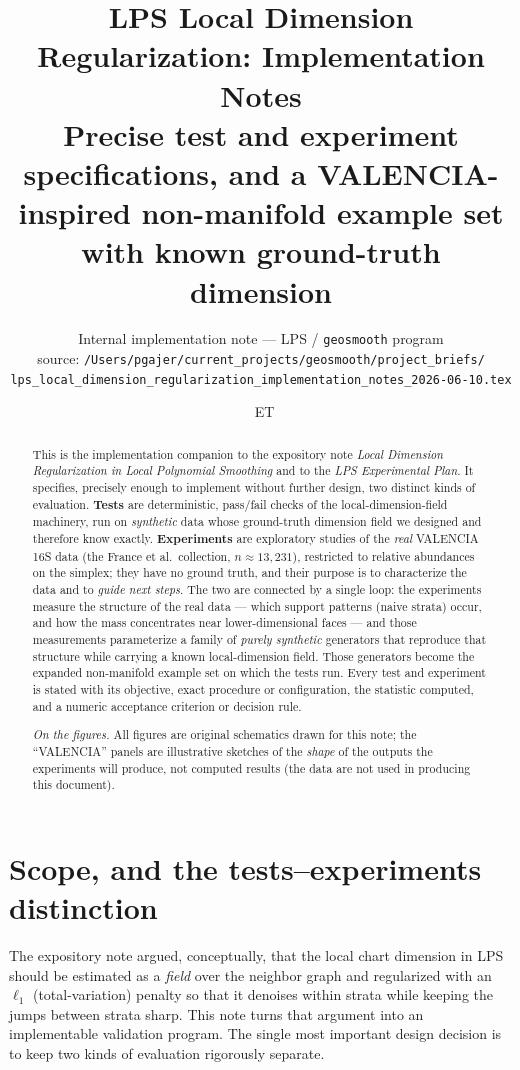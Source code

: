 \documentclass[11pt]{article}
\title{\textbf{LPS Local Dimension Regularization: Implementation Notes}\\[4pt]
\large Precise test and experiment specifications, and a VALENCIA-inspired
non-manifold example set with known ground-truth dimension}
\author{\small Internal implementation note --- LPS / \texttt{geosmooth} program\\[2pt]
\footnotesize source: \nolinkurl{/Users/pgajer/current_projects/geosmooth/project_briefs/}\\[1pt]
\footnotesize\nolinkurl{lps_local_dimension_regularization_implementation_notes_2026-06-10.tex}}
\date{\DTMnow\ \textnormal{\footnotesize ET}}
\theoremstyle{definition}
\begin{document}
\maketitle

\begin{abstract}\noindent
This is the implementation companion to the expository note
\emph{Local Dimension Regularization in Local Polynomial Smoothing} and to the
\emph{LPS Experimental Plan}. It specifies, precisely enough to implement without
further design, two distinct kinds of evaluation. \textbf{Tests} are
deterministic, pass/fail checks of the local-dimension-field machinery, run on
\emph{synthetic} data whose ground-truth dimension field we designed and therefore
know exactly. \textbf{Experiments} are exploratory studies of the \emph{real}
VALENCIA 16S data (the France et al.\ collection, $n\approx 13{,}231$), restricted
to relative abundances on the simplex; they have no ground truth, and their
purpose is to characterize the data and to \emph{guide next steps}. The two are
connected by a single loop: the experiments measure the structure of the real
data --- which support patterns (naive strata) occur, and how the mass
concentrates near lower-dimensional faces --- and those measurements parameterize
a family of \emph{purely synthetic} generators that reproduce that structure while
carrying a known local-dimension field. Those generators become the expanded
non-manifold example set on which the tests run. Every test and experiment is
stated with its objective, exact procedure or configuration, the statistic
computed, and a numeric acceptance criterion or decision rule.
\par\medskip\noindent\footnotesize\textit{On the figures.} All figures are
original schematics drawn for this note; the ``VALENCIA'' panels are illustrative
sketches of the \emph{shape} of the outputs the experiments will produce, not
computed results (the data are not used in producing this document).
\end{abstract}

{\small\tableofcontents}

\section{Scope, and the tests--experiments distinction}\label{sec:scope}

The expository note argued, conceptually, that the local chart dimension in LPS
should be estimated as a \emph{field} over the neighbor graph and regularized with
an $\ell_1$ (total-variation) penalty so that it denoises within strata while
keeping the jumps between strata sharp. This note turns that argument into an
implementable validation program. The single most important design decision is
to keep two kinds of evaluation rigorously separate.
\end{document}
